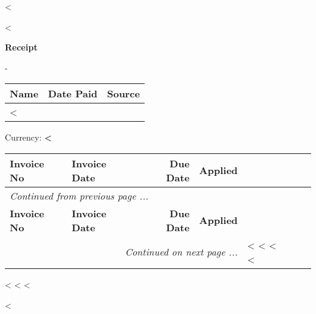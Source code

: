 <%

\begin{CJK}{UTF8}{arialuni}

\vspace*{-3.3cm}
<%
\vspace*{0.5cm}

\centerline{\large\bf{Receipt}}
\normalsize

\vspace{2.5cm}
-
\vspace{0.5cm}

\begin{tabularx}{\textwidth}{*{3}{|X}|} \hline
  \textbf{Name} & \textbf{Date Paid} & \textbf{Source} \\ 
  \hline
	<%
  \hline
\end{tabularx}

\vspace{0.5cm}
Currency: \textbf{<%
}
\vspace{0.5cm}  

\begin{longtable}{|l p{5.5cm} @{\extracolsep\fill} rr|} \hline
  \textbf{Invoice No} & \textbf{Invoice Date} & \textbf{Due Date} & \textbf{Applied} \\     
  \hline
\endfirsthead
  \multicolumn{3}{l}{\emph{Continued from previous page ...}} \\
  \hline
  \textbf{Invoice No} & \textbf{Invoice Date} & \textbf{Due Date} & \textbf{Applied} \\     
  \hline
\endhead
   \hline \multicolumn{4}{r}{\emph{Continued on next page ...}}
\endfoot
   \hline
   \multicolumn{3}{|r} \textbf{Total} & <%
	\hline
\endlastfoot
<%
  <%
<%
\end{longtable}

\vspace{1cm}

<%
  <%
<%

\vfill
<%
\end{CJK}

